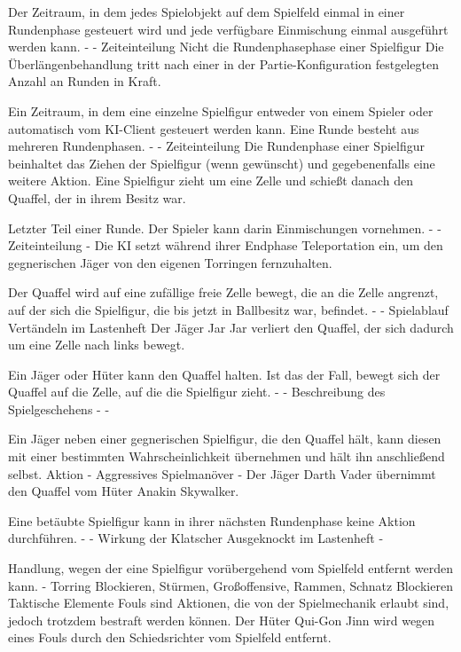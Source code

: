 {Der Zeitraum, in dem jedes Spielobjekt auf dem Spielfeld einmal in einer Rundenphase gesteuert wird und jede verfügbare Einmischung einmal ausgeführt werden kann.}
{-}
{-}
{Zeiteinteilung}
{Nicht die Rundenphasephase einer Spielfigur}
{Die Überlängenbehandlung tritt nach einer in der Partie-Konfiguration festgelegten Anzahl an Runden in Kraft.}

{Ein Zeitraum, in dem eine einzelne Spielfigur entweder von einem Spieler oder automatisch vom KI-Client gesteuert werden kann. Eine Runde besteht aus mehreren Rundenphasen.}
{-}
{-}
{Zeiteinteilung}
{Die Rundenphase einer Spielfigur beinhaltet das Ziehen der Spielfigur (wenn gewünscht) und gegebenenfalls eine weitere Aktion.}
{Eine Spielfigur zieht um eine Zelle und schießt danach den Quaffel, der in ihrem Besitz war.}

{Letzter Teil einer Runde. Der Spieler kann darin Einmischungen vornehmen.}
{-}
{-}
{Zeiteinteilung}
{-}
{Die KI setzt während ihrer Endphase Teleportation ein, um den gegnerischen Jäger von den eigenen Torringen fernzuhalten.}

{Der Quaffel wird auf eine zufällige freie Zelle bewegt, die an die Zelle angrenzt, auf der sich die Spielfigur, die bis jetzt in Ballbesitz war, befindet.}
{-}
{-}
{Spielablauf}
{\glqq{}Vertändeln\grqq{}  im Lastenheft}
{Der Jäger \glqq{}Jar Jar\grqq{} verliert den Quaffel, der sich dadurch um eine Zelle nach links bewegt.}

{Ein Jäger oder Hüter kann den Quaffel halten. Ist das der Fall, bewegt sich der Quaffel auf die Zelle, auf die die Spielfigur zieht.}
{-}
{-}
{Beschreibung des Spielgeschehens}
{-}
{-}

{Ein Jäger neben einer gegnerischen Spielfigur, die den Quaffel hält, kann diesen mit einer bestimmten Wahrscheinlichkeit übernehmen und hält ihn anschließend selbst.}
{Aktion}
{-}
{Aggressives Spielmanöver}
{-}
{Der Jäger \glqq{}Darth Vader\grqq{} übernimmt den Quaffel vom Hüter \glqq{}Anakin Skywalker\grqq{}.}

{Eine betäubte Spielfigur kann in ihrer nächsten Rundenphase keine Aktion durchführen.}
{-}
{-}
{Wirkung der Klatscher}
{\glqq{}Ausgeknockt\grqq{}  im Lastenheft}
{-}

{Handlung, wegen der eine Spielfigur vorübergehend vom Spielfeld entfernt werden kann.}
{-}
{Torring Blockieren, Stürmen, Großoffensive, Rammen, Schnatz Blockieren}
{Taktische Elemente}
{Fouls sind Aktionen, die von der Spielmechanik erlaubt sind, jedoch trotzdem bestraft werden können.}
{Der Hüter \glqq{}Qui-Gon Jinn\grqq{} wird wegen eines Fouls durch den Schiedsrichter vom Spielfeld entfernt.}

